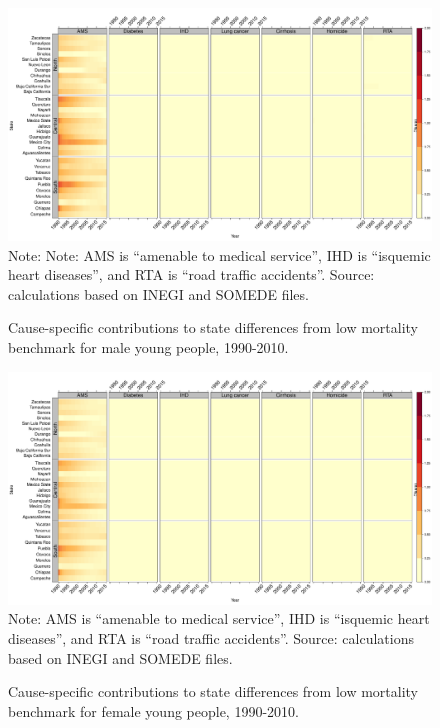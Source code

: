 \documentclass[11.5pt]{article}
\begin{document}
{\begin{figure}
\centering
\caption{Cause-specific contributions to state differences from low mortality benchmark for male young people, 1990-2010.}
\label{fig:e0_14_males}
\includegraphics[scale=.3]{Young_Male_heatmap.pdf}
Note: Note: AMS is ``amenable to medical service'', IHD is ``isquemic heart diseases'', and RTA is ``road traffic accidents''. Source: calculations based on INEGI and SOMEDE files. \end{figure}

\begin{figure}
\centering
\caption{Cause-specific contributions to state differences from low mortality benchmark for female young people, 1990-2010.}
\label{fig:e0_14_females}
\includegraphics[scale=.3]{Young_Female_heatmap.pdf}
Note: AMS is ``amenable to medical service'', IHD is ``isquemic heart diseases'', and RTA is ``road traffic accidents''. Source: calculations based on INEGI and SOMEDE files. \end{figure}



}
\end{document}
